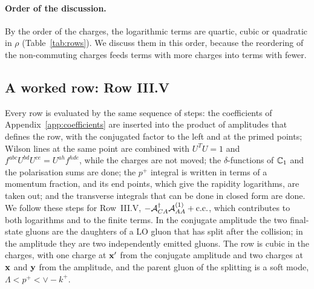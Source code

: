 \paragraph{Order of the discussion.} By the order of the charges, the logarithmic terms are quartic, cubic or quadratic in $\rho$ (Table~\ref{tab:rows}). We discuss them in this order, because the reordering of the non-commuting charges feeds terms with more charges into terms with fewer.

\subsection{A worked row: Row III.V}\label{sec:ex_III_V}

Every row is evaluated by the same sequence of steps: the coefficients of Appendix~\ref{app:coefficients} are inserted into the product of amplitudes that defines the row, with the conjugated factor to the left and at the primed points; Wilson lines at the same point are combined with $U^TU=1$ and $f^{abc}U^{bd}U^{ce}=U^{ah}f^{hde}$, while the charges are not moved; the $\delta$-functions of $\mathbb{C}_1$ and the polarisation sums are done; the $p^+$ integral is written in terms of a momentum fraction, and its end points, which give the rapidity logarithms, are taken out; and the transverse integrals that can be done in closed form are done. We follow these steps for Row~III.V, $-\mathcal A^\dagger_{CA}\mathcal A^{(1)}_{AA}+{\rm c.c.}$, which contributes to both logarithms and to the finite terms. In the conjugate amplitude the two final-state gluons are the daughters of a LO gluon that has split after the collision; in the amplitude they are two independently emitted gluons. The row is cubic in the charges, with one charge at $\mathbf{x}'$ from the conjugate amplitude and two charges at $\mathbf{x}$ and $\mathbf{y}$ from the amplitude, and the parent gluon of the splitting is a soft mode, $\Lambda<p^+<\vee-k^+$.

